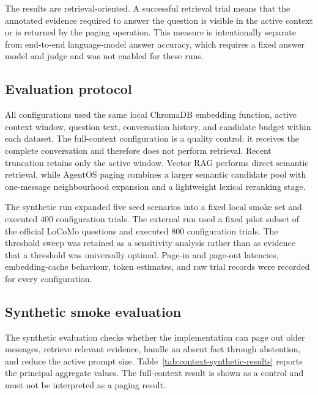 The results are retrieval-oriented. A successful retrieval trial means that the annotated evidence required to answer the question is visible in the active context or is returned by the paging operation. This measure is intentionally separate from end-to-end language-model answer accuracy, which requires a fixed answer model and judge and was not enabled for these runs.

\subsection{Evaluation protocol}

All configurations used the same local ChromaDB embedding function, active context window, question text, conversation history, and candidate budget within each dataset. The full-context configuration is a quality control: it receives the complete conversation and therefore does not perform retrieval. Recent truncation retains only the active window. Vector RAG performs direct semantic retrieval, while AgentOS paging combines a larger semantic candidate pool with one-message neighbourhood expansion and a lightweight lexical reranking stage.

The synthetic run expanded five seed scenarios into a fixed local smoke set and executed 400 configuration trials. The external run used a fixed pilot subset of the official LoCoMo questions and executed 800 configuration trials. The threshold sweep was retained as a sensitivity analysis rather than as evidence that a threshold was universally optimal. Page-in and page-out latencies, embedding-cache behaviour, token estimates, and raw trial records were recorded for every configuration.

\subsection{Synthetic smoke evaluation}

The synthetic evaluation checks whether the implementation can page out older messages, retrieve relevant evidence, handle an absent fact through abstention, and reduce the active prompt size. Table~\ref{tab:context-synthetic-results} reports the principal aggregate values. The full-context result is shown as a control and must not be interpreted as a paging result.

